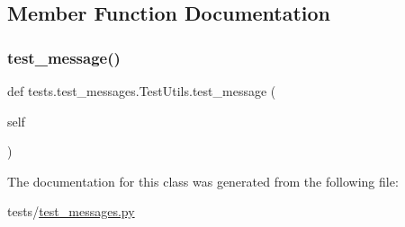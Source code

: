 \subsection{Member Function Documentation}
\mbox{\label{classtests_1_1test__messages_1_1TestUtils_ab43cf75c46098c2d2bd7ee061c93be96}} 
\subsubsection{\texorpdfstring{test\+\_\+message()}{test\_message()}}
{\footnotesize\ttfamily def tests.\+test\+\_\+messages.\+Test\+Utils.\+test\+\_\+message (\begin{DoxyParamCaption}\item[{}]{self }\end{DoxyParamCaption})}



The documentation for this class was generated from the following file\+:\begin{DoxyCompactItemize}
\item 
tests/\hyperlink{test__messages_8py}{test\+\_\+messages.\+py}\end{DoxyCompactItemize}
